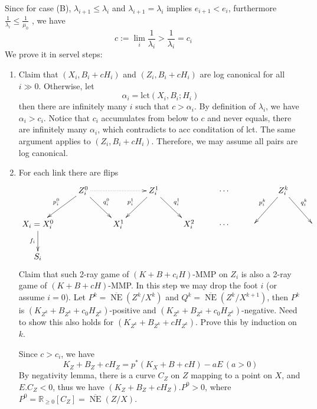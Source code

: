 \documentclass{article}
\begin{document}
Since for case (B), $ \lambda_{i+1}\leqslant \lambda_i $ and $ \lambda_{i+1}=\lambda_i $ implies $ e_{i+1}<e_i $, furthermore $ \frac{1}{\lambda_i}\leqslant \frac{1}{\mu_0} $ , we have
\[ c:=\lim_{i}\frac{1}{\lambda_i}>\frac{1}{\lambda_i}=c_i \]
We prove it in servel steps:
\begin{enumerate}[Step 1]
  \item Claim that $ (X_i,B_i+cH_i) $ and $ (Z_i,B_i+cH_i) $ are log canonical for all $ i\gg 0 $. Otherwise, let
  \[ \alpha_i=\mathrm{lct}(X_i,B_i;H_i) \]
  then there are infinitely many $ i $ such that $ c>\alpha_i $. By definition of $ \lambda_i $, we have $ \alpha_i>c_i $. Notice that $ c_i $ accumulates from below to $ c $ and never equals, there are infinitely many $ \alpha_i $, which contradicts to acc conditation of lct. The same argument applies to $ (Z_i,B_i+cH_i) $. Therefore, we may assume all pairs are log canonical.
  \item For each link there are flips
  \[ \xymatrix{
    &Z_i^0\ar[ld]_{p^0_i}\ar[dr]^{q^0_i}\ar@{.>}[rr]&&Z_i^1\ar[ld]_{p^1_i}\ar[rd]^{q^1_i}&&\cdots&&Z_i^k\ar[ld]_{p^k_i}\ar[dr]^{q^k_i}\\
    X_i=X^0_i\ar[d]_{f_i} &&X^1_i&&X_i^2&\cdots&&&\\
    S_i }\]
  Claim that such 2-ray game of $ (K+B+c_iH) $-MMP on $ Z_i $ is also a 2-ray game of $ (K+B+cH) $-MMP. In this step we may drop the foot $ i $ (or assume $ i=0 $). Let $ P^k=\overline{\operatorname{NE}}(Z^k/X^k) $ and $ Q^k=\overline{\operatorname{NE}}(Z^k/X^{k+1}) $, then $ P^k $ is $ (K_{Z^k}+B_{Z^k}+c_0H_{Z^k}) $-positive and $ (K_{Z^k}+B_{Z^k}+c_0H_{Z^k}) $-negative. Need to show this also holds for $ (K_{Z^k}+B_{Z^k}+cH_{Z^k}) $. Prove this by induction on $ k $.
  
  Since $ c>c_i $, we have 
  \[ K_Z+B_Z+cH_Z=p^*(K_X+B+cH)-aE\,(a>0) \]
  By negativity lemma, there is a curve $ C_Z $ on $ Z $ mapping to a point on $ X $, and $ E.C_Z<0 $, thus we have $ (K_Z+B_Z+cH_Z).P^0>0 $, where $ P^0=\mathbb{R}_{\geqslant0}[C_Z]=\overline{\operatorname{NE}}(Z/X) $.
  

\end{enumerate}
\end{document}
